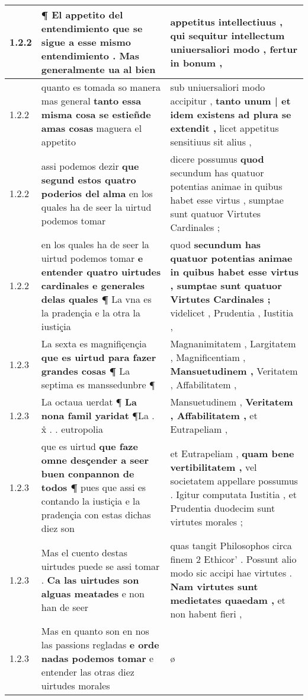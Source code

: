 \begin{tabular}{|p{1cm}|p{6.5cm}|p{6.5cm}|}
1.2.2 & ¶ El appetito del entendimiento \textbf{ que se sigue a esse mismo entendimiento . } Mas generalmente ua al bien & appetitus intellectiuus , \textbf{ qui sequitur intellectum uniuersaliori modo , } fertur in bonum , \\\hline
1.2.2 & quanto es tomada so manera mas general \textbf{ tanto essa misma cosa se estieñde amas cosas } maguera el appetito & sub uniuersaliori modo accipitur , \textbf{ tanto unum | et idem existens ad plura se extendit , } licet appetitus sensitiuus sit alius , \\\hline
1.2.2 & assi podemos dezir \textbf{ que segund estos quatro poderios del alma } en los quales ha de seer la uirtud podemos tomar & dicere possumus \textbf{ quod } secundum has quatuor potentias animae in quibus habet esse virtus , sumptae sunt quatuor Virtutes Cardinales ; \\\hline
1.2.2 & en los quales ha de seer la uirtud podemos tomar \textbf{ e entender quatro uirtudes cardinales e generales delas quales ¶ } La vna es la pradençia e la otra la iustiçia & quod \textbf{ secundum has quatuor potentias animae in quibus habet esse virtus , sumptae sunt quatuor Virtutes Cardinales ; } videlicet , Prudentia , Iustitia , \\\hline
1.2.3 & La sexta es magnifiçençia \textbf{ que es uirtud para fazer grandes cosas ¶ } La septima es manssedunbre ¶ & Magnanimitatem , Largitatem , Magnificentiam , \textbf{ Mansuetudinem , } Veritatem , Affabilitatem , \\\hline
1.2.3 & La octaua uerdat ¶ \textbf{ La nona famil yaridat } ¶La . x̊ . . eutropolia & Mansuetudinem , \textbf{ Veritatem , Affabilitatem , } et Eutrapeliam , \\\hline
1.2.3 & que es uirtud \textbf{ que faze omne desçender a seer buen conpannon de todos ¶ } pues que assi es contando la iustiçia e la pradençia con estas dichas diez son & et Eutrapeliam , \textbf{ quam bene vertibilitatem , } vel societatem appellare possumus . Igitur computata Iustitia , et Prudentia duodecim sunt virtutes morales ; \\\hline
1.2.3 & Mas el cuento destas uirtudes puede se assi tomar . \textbf{ Ca las uirtudes son alguas meatades } e non han de seer & quas tangit Philosophos circa finem 2 Ethicor’ . Possunt alio modo sic accipi hae virtutes . \textbf{ Nam virtutes sunt medietates quaedam , } et non habent fieri , \\\hline
1.2.3 & Mas en quanto son en nos las passions regladas \textbf{ e orde nadas podemos tomar } e entender las otras diez uirtudes morales & ø \\\hline

\end{tabular}
